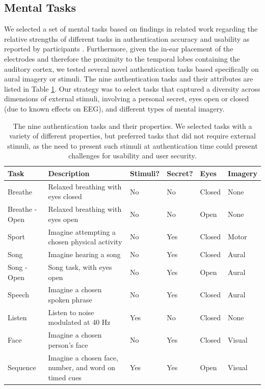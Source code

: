 \documentclass[a4paper,twoside]{article}
\begin{document}
\subsection{Mental Tasks}

\noindent We selected a set of mental tasks based on findings in related work regarding the relative strengths of different tasks in authentication accuracy and usability as reported by participants \cite{Chuang2013b,curran2016passthoughts}. Furthermore, given the in-ear placement of the electrodes and therefore the proximity to the temporal lobes containing the auditory cortex, we tested several novel authentication tasks based specifically on aural imagery or stimuli. The nine authentication tasks and their attributes are listed in Table \ref{tab:tasks}. Our strategy was to select tasks that captured a diversity across dimensions of external stimuli, involving a personal secret, eyes open or closed (due to known effects on EEG), and different types of mental imagery.

\begin{table}[t]
\caption{The nine authentication tasks and their properties. We selected tasks with a variety of different properties, but preferred tasks that did not require external stimuli, as the need to present such stimuli at authentication time could present challenges for usability and user security.}
\label{tab:tasks}
\centering
\begin{tabularx}{\textwidth}{llllll}

\textbf{Task} & \textbf{Description} & \textbf{Stimuli}? & \textbf{Secret}? & \textbf{Eyes} & \textbf{Imagery}\\
\hline
Breathe & Relaxed breathing with eyes closed & No & No & Closed & None\\
Breathe - Open & Relaxed breathing with eyes open & No & No & Open & None\\
Sport & Imagine attempting a chosen physical activity & No & Yes & Closed & Motor\\
Song & Imagine hearing a song & No & Yes & Closed & Aural\\
Song - Open & Song task, with eyes open & No & Yes & Open & Aural\\
Speech & Imagine a chosen spoken phrase & No & Yes & Closed & Aural\\
Listen & Listen to noise modulated at 40 Hz & Yes & No & Closed & None\\
Face & Imagine a chosen person's face & No & Yes & Closed & Visual\\
Sequence & Imagine a chosen face, number, and word on timed cues & Yes & Yes & Open & Visual\\
\hline
\end{tabularx}
\end{table}
\end{document}
